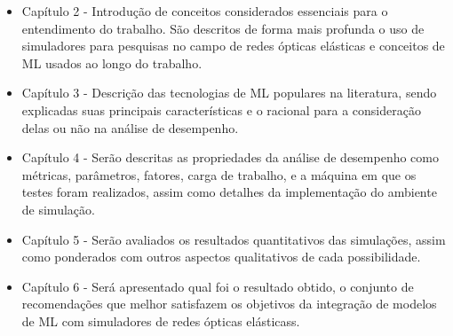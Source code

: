 \begin{itemize}
  \item Capítulo 2 - Introdução de conceitos considerados essenciais para o entendimento do trabalho. São descritos de forma mais profunda o uso de simuladores para pesquisas no campo de redes ópticas elásticas e conceitos de ML usados ao longo do trabalho.

  \item Capítulo 3 - Descrição das tecnologias de ML populares na literatura, sendo explicadas suas principais características e o racional para a consideração delas ou não na análise de desempenho.

  \item Capítulo 4 - Serão descritas as propriedades da análise de desempenho como métricas, parâmetros, fatores, carga de trabalho, e a máquina em que os testes foram realizados, assim como detalhes da implementação do ambiente de simulação.

  \item Capítulo 5 - Serão avaliados os resultados quantitativos das simulações, assim como ponderados com outros aspectos qualitativos de cada possibilidade.

  \item Capítulo 6 - Será apresentado qual foi o resultado obtido, o conjunto de recomendações que melhor satisfazem os objetivos da integração de modelos de ML com simuladores de redes ópticas elásticass.
\end{itemize}









